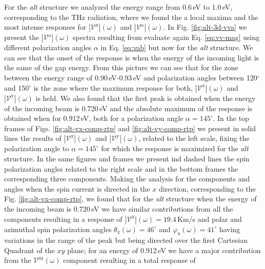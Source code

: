 \documentclass[prb,11pt,tightenlines,twocolumn,aps]{revtex4-1}
\begin{document}
For the \emph{alt} structure we analyzed the energy range from 0.6\,eV to
1.0\,eV, corresponding to the THz radiation, where we found the a local maxima
and the most intense responses for $|\mathcal{V}^{\mathrm{x}}|(\omega)$ and
$|\mathcal{V}^{\mathrm{a}}|(\omega)$. In Fig. \ref{fig:alt-3d-vva} we present
the $|\mathcal{V}^{\mathrm{a}}|(\omega)$ spectra resulting from evaluate again
Eq. \eqref{eq:vv-mag} using different polarization angles $\alpha$ in Eq.
\eqref{eq:vab} but now for the \emph{alt} structure. We can see that the onset
of the response is when the energy of the incoming light is the same of the gap
energy.
%
From this picture we can see that for the zone between the energy range of
0.90\,eV-0.93\,eV and polarization angles between 120$^{\circ}$ and
150$^{\circ}$ is the zone where the maximum response for both,
$|\mathcal{V}^{\mathrm{x}}|(\omega)$ and $|\mathcal{V}^{\mathrm{y}}|(\omega)$ is
held. We also found that the first peak is obtained when the energy of the
incoming beam is 0.720\,eV and  the absolute maximum of the response is obtained
when for 0.912\,eV, both for a polarization angle $\alpha = 145^{\circ}$.
In the top frames of Figs. \ref{fig:alt-vx-comp-rtp}  and 
%
\ref{fig:alt-vy-comp-rtp} we present in solid lines the results of
$|\mathcal{V}^{\mathrm{x}}|(\omega)$ and $|\mathcal{V}^{\mathrm{y}}|(\omega)$,
related to the left scale, fixing the polarization angle to $\alpha=145^{\circ}$
for which the response is maximized for the \emph{alt} structure. In the same
figures and frames we present ind dashed lines the spin polarization angles
related to the right scale and in the bottom frames the corresponding three
components.
% 
Making the analysis for the components and angles when the spin current is
directed in the $x$ direction, corresponding to the Fig. 
% 
\ref{fig:alt-vx-comp-rtp}, we found that for the \emph{alt} structure when the
energy of the incoming beam is 0.720\,eV we have similar contributions from all
the components resulting in a response of
$|\mathcal{V}^{\mathrm{x}}|(\omega)=19.4$\,Km/s and polar and azimuthal spin
polarization angles $\theta_{\mathrm{x}}(\omega)=46^{\circ}$ and
$\varphi_{\mathrm{x}}(\omega)=41^{\circ}$ having variations in the range of the
peak but being directed over the first Cartesian Quadrant of the $xy$ plane;
% 
for an energy of 0.912\,eV we have a major contribution from the
$\mathcal{V}^{\mathrm{xz}}(\omega)$ component resulting in a total response of
\end{document}
